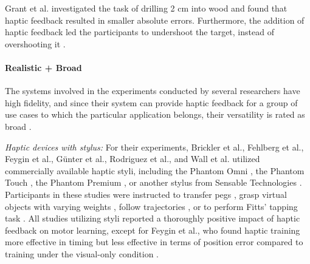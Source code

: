 Grant et al. investigated the task of drilling 2 cm into wood and found that haptic feedback resulted in smaller absolute errors. Furthermore, the addition of haptic feedback led the participants to undershoot the target, instead of overshooting it \cite{Grant2019}. 


\paragraph{Realistic + Broad} \label{sec:realisticbroad}
The systems involved in the experiments conducted by several researchers have high fidelity, and since their system can provide haptic feedback for a group of use cases to which the particular application belongs, their versatility is rated as broad \cite{Brickler2019, Caccianiga2021, Chi2017, Dai2023, Fehlberg2012, Feygin2002HapticSkill, Gambaro2014, Gunter2022, Morris2007, Oquendo2024, Rodriguez2010, Wall2000, Yang2023}.

\textit{Haptic devices with stylus:} For their experiments, Brickler et al., Fehlberg et al., Feygin et al., Günter et al., Rodriguez et al., and Wall et al. utilized commercially available haptic styli, including the Phantom Omni \cite{Brickler2019, Fehlberg2012}, the Phantom Touch \cite{Gunter2022}, the Phantom Premium \cite{Rodriguez2010, Wall2000}, or another stylus from Sensable Technologies \cite{Feygin2002HapticSkill}. Participants in these studies were instructed to transfer pegs \cite{Brickler2019}, grasp virtual objects with varying weights \cite{Gunter2022}, follow trajectories \cite{Fehlberg2012, Feygin2002HapticSkill, Rodriguez2010}, or to perform Fitts' tapping task \cite{Wall2000, Fitts1954TheMovement}. All studies utilizing styli reported a thoroughly positive impact of haptic feedback on motor learning, except for Feygin et al., who found haptic training more effective in timing but less effective in terms of position error compared to training under the visual-only condition \cite{Feygin2002HapticSkill}.

